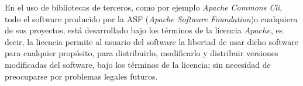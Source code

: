 En el uso de bibliotecas de terceros, como por ejemplo \textit{Apache Commons Cli}, todo el software producido por la ASF (\textit{Apache Software Foundation})o cualquiera de sus proyectos, está desarrollado bajo los términos de la licencia $Apache$, es decir, la licencia permite al usuario del software la libertad de usar dicho software para cualquier propósito, para distribuirlo, modificarlo y distribuir versiones modificadas del software, bajo los términos de la licencia; sin necesidad de preocuparse por problemas legales futuros.\cite{http://es.wikipedia.org/wiki/Apache_License} 

